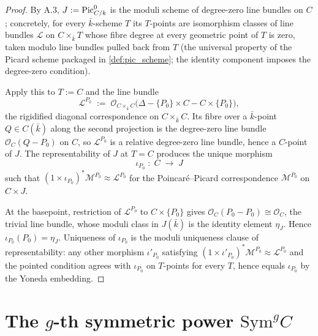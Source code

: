\begin{proof}
  
  By A.3, \(J := \operatorname{Pic}^0_{C/k}\) is the moduli scheme of degree-zero line bundles
  on \(C\); concretely, for every \(\bar k\)-scheme \(T\) its \(T\)-points are
  isomorphism classes of line bundles \(\mathcal L\) on \(C \times_{\bar k} T\)
  whose fibre degree at every geometric point of \(T\) is zero, taken modulo line
  bundles pulled back from \(T\) (the universal property of the Picard scheme
  packaged in \cref{def:pic_scheme}; the identity component imposes the
  degree-zero condition).

  Apply this to \(T := C\) and the line bundle
  \[
    \mathcal L^{P_0} \;:=\; \mathcal O_{C \times_{\bar k} C}\bigl(\Delta -
      \{P_0\} \times C - C \times \{P_0\}\bigr),
  \]
  the rigidified diagonal correspondence on \(C \times_{\bar k} C\). Its fibre
  over a \(\bar k\)-point \(Q \in C(\bar k)\) along the second projection is the
  degree-zero line bundle \(\mathcal O_C(Q - P_0)\) on \(C\), so \(\mathcal L^{P_0}\)
  is a relative degree-zero line bundle, hence a \(C\)-point of \(J\). The
  representability of \(J\) at \(T = C\) produces the unique morphism
  \[
    \iota_{P_0} \;\colon\; C \;\longrightarrow\; J
  \]
  such that \((1 \times \iota_{P_0})^*\mathcal M^{P_0} \approx \mathcal L^{P_0}\)
  for the Poincar\'e--Picard correspondence \(\mathcal M^{P_0}\) on \(C \times J\).

  At the basepoint, restriction of \(\mathcal L^{P_0}\) to \(C \times \{P_0\}\)
  gives \(\mathcal O_C(P_0 - P_0) \cong \mathcal O_C\), the trivial line bundle,
  whose moduli class in \(J(\bar k)\) is the identity element \(\eta_J\). Hence
  \(\iota_{P_0}(P_0) = \eta_J\). Uniqueness of \(\iota_{P_0}\) is the moduli
  uniqueness clause of representability: any other morphism \(\iota'_{P_0}\)
  satisfying \((1 \times \iota'_{P_0})^*\mathcal M^{P_0} \approx \mathcal L^{P_0}\)
  and the pointed condition agrees with \(\iota_{P_0}\) on \(T\)-points for every
  \(T\), hence equals \(\iota_{P_0}\) by the Yoneda embedding.
\end{proof}

\section{The \(g\)-th symmetric power \(\mathrm{Sym}^g C\)}
\label{sec:albaneseup_sym_g}

